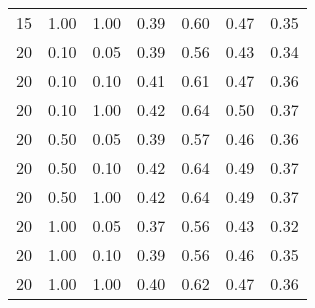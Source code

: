 \begin{tabular}{lllcccc}
15 & 1.00 & 1.00 & 0.39 & 0.60 & 0.47 & 0.35 \\ 
20 & 0.10 & 0.05 & 0.39 & 0.56 & 0.43 & 0.34 \\ 
20 & 0.10 & 0.10 & 0.41 & 0.61 & 0.47 & 0.36 \\ 
20 & 0.10 & 1.00 & 0.42 & 0.64 & 0.50 & 0.37 \\ 
20 & 0.50 & 0.05 & 0.39 & 0.57 & 0.46 & 0.36 \\ 
20 & 0.50 & 0.10 & 0.42 & 0.64 & 0.49 & 0.37 \\ 
20 & 0.50 & 1.00 & 0.42 & 0.64 & 0.49 & 0.37 \\ 
20 & 1.00 & 0.05 & 0.37 & 0.56 & 0.43 & 0.32 \\ 
20 & 1.00 & 0.10 & 0.39 & 0.56 & 0.46 & 0.35 \\ 
20 & 1.00 & 1.00 & 0.40 & 0.62 & 0.47 & 0.36 \\ 
\end{tabular} 
